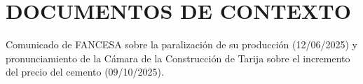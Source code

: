 \chapter{DOCUMENTOS DE CONTEXTO}
Comunicado de FANCESA sobre la paralización de su producción (12/06/2025) y pronunciamiento de la Cámara de la Construcción de Tarija sobre el incremento del precio del cemento (09/10/2025).


